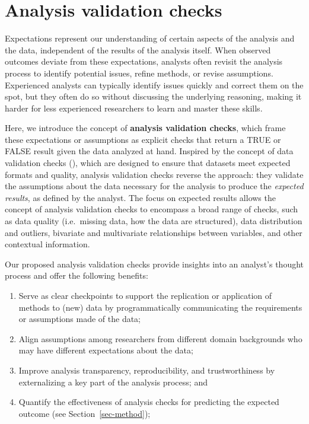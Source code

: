 \documentclass[
  12pt,
]{interact}
\providecommand{\tightlist}{%
  \setlength{\itemsep}{0pt}\setlength{\parskip}{0pt}}\usepackage{longtable,booktabs,array}
\begin{document}
\section{Analysis validation checks}\label{sec-plan}

Expectations represent our understanding of certain aspects of the
analysis and the data, independent of the results of the analysis
itself. When observed outcomes deviate from these expectations, analysts
often revisit the analysis process to identify potential issues, refine
methods, or revise assumptions. Experienced analysts can typically
identify issues quickly and correct them on the spot, but they often do
so without discussing the underlying reasoning, making it harder for
less experienced researchers to learn and master these skills.

Here, we introduce the concept of \textbf{analysis validation checks},
which frame these expectations or assumptions as explicit checks that
return a TRUE or FALSE result given the data analyzed at hand. Inspired
by the concept of data validation checks (\citet{validate}), which are
designed to ensure that datasets meet expected formats and quality,
analysis validation checks reverse the approach: they validate the
assumptions about the data necessary for the analysis to produce the
\emph{expected results}, as defined by the analyst. The focus on
expected results allows the concept of analysis validation checks to
encompass a broad range of checks, such as data quality (i.e.~missing
data, how the data are structured), data distribution and outliers,
bivariate and multivariate relationships between variables, and other
contextual information.

Our proposed analysis validation checks provide insights into an
analyst's thought process and offer the following benefits:

\begin{enumerate}
\def\labelenumi{\arabic{enumi}.}
\tightlist
\item
  Serve as clear checkpoints to support the replication or application
  of methods to (new) data by programmatically communicating the
  requirements or assumptions made of the data;
\item
  Align assumptions among researchers from different domain backgrounds
  who may have different expectations about the data;
\item
  Improve analysis transparency, reproducibility, and trustworthiness by
  externalizing a key part of the analysis process; and
\item
  Quantify the effectiveness of analysis checks for predicting the
  expected outcome (see Section~\ref{sec-method});
\end{enumerate}
\end{document}
